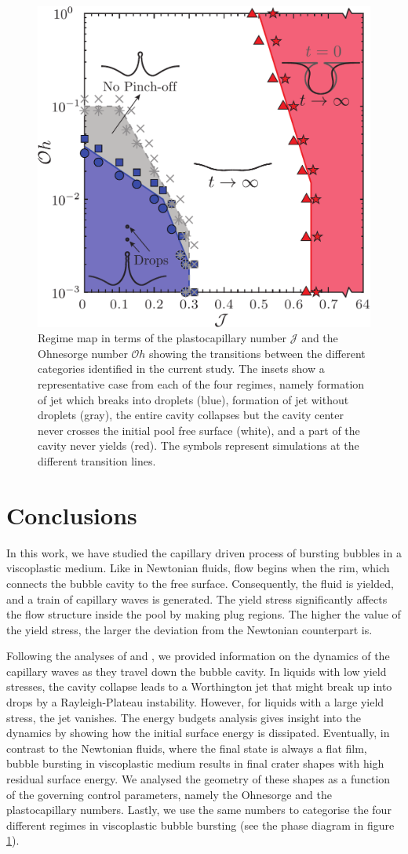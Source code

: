 \documentclass[final]{jfm}
\begin{document}
 \begin{figure}
	\centerline{\includegraphics[width=0.5\linewidth]{Figure8_RegimeMap-eps-converted-to.pdf}}%
	\caption{Regime map in terms of the plastocapillary number $\mathcal{J}$ and the Ohnesorge number $\mathcal{O}h$ showing the transitions between the different categories identified in the current study. The insets show a representative case from each of the four regimes, namely formation of jet which breaks into droplets (blue), formation of jet without droplets (gray), the entire cavity collapses but the cavity center never crosses the initial pool free surface (white), and a part of the cavity never yields (red). The symbols represent simulations at the different transition lines.}
	\label{fig:Regime_Map}
\end{figure}

\section{Conclusions}\label{Sec::Conclusion}
In this work, we have studied the capillary driven process of bursting bubbles in a viscoplastic medium. Like in Newtonian fluids, flow begins when the rim, which connects the bubble cavity to the free surface. Consequently, the fluid is yielded, and a train of capillary waves is generated. The yield stress significantly affects the flow structure inside the pool by making plug regions. The higher the value of the yield stress, the larger the deviation from the Newtonian counterpart is. 

Following the analyses of \citet{deike2018dynamics} and \citet{gordillo2019capillary}, we provided information on the dynamics of the capillary waves as they travel down the bubble cavity. In liquids with low yield stresses, the cavity collapse leads to a Worthington jet that might break up into drops by a Rayleigh-Plateau instability. However, for liquids with a large yield stress, the jet vanishes. The energy budgets analysis gives insight into the dynamics by showing how the initial surface energy is dissipated. Eventually, in contrast to the Newtonian fluids, where the final state is always a flat film, bubble bursting in viscoplastic medium results in final crater shapes with high residual surface energy. We analysed the geometry of these shapes as a function of the governing control parameters, namely the Ohnesorge and the plastocapillary numbers. Lastly, we use the same numbers to categorise the four different regimes in viscoplastic bubble bursting (see the phase diagram in figure \ref{fig:Regime_Map}).
\end{document}
